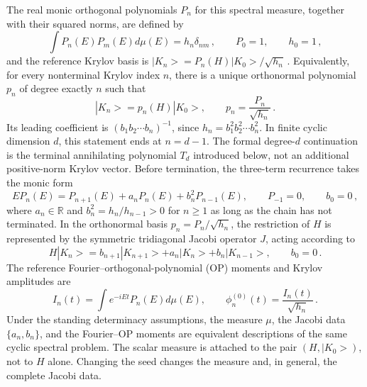 \documentclass[a4paper,11pt]{article}
\def\ket#1{|#1>}%
\def\dd{d}%
\def\ii{i}%
\def\ee{e}%
\def\Jac{J}%
\theoremstyle{definition}
\theoremstyle{remark}
\newcommand{\ket}[1]{|#1\rangle}
\newcommand{\dd}{\mathrm d}
\newcommand{\ii}{\mathrm i}
\newcommand{\ee}{\mathrm e}
\newcommand{\RR}{\mathbb R}
\newcommand{\Jac}{\mathsf J}
\begin{document}
The real monic orthogonal polynomials $P_n$ for this spectral measure, together with their squared norms, are defined by
\begin{equation}
   \int P_n(E)P_m(E)\dd\mu(E)=h_n\delta_{nm}\,,
   \qquad
   P_0=1,\qquad h_0=1\,,
   \label{eq:base-orthogonality}
\end{equation}
and the reference Krylov basis is
$
   \ket{K_n}=P_n(H)\ket{K_0}/\sqrt{h_n}\,.
$
Equivalently, for every nonterminal Krylov index $n$, there is a unique orthonormal polynomial $p_n$ of degree exactly $n$ such that
\begin{equation}
   \ket{K_n}=p_n(H)\ket{K_0},
   \qquad
   p_n=\frac{P_n}{\sqrt{h_n}}\,.
   \label{eq:orthonormal-polynomial-representative-main}
\end{equation}
Its leading coefficient is $(b_1b_2\cdots b_n)^{-1}$, since
$h_n=b_1^2b_2^2\cdots b_n^2$. In finite cyclic dimension $d$, this statement ends at $n=d-1$. The formal degree-$d$ continuation is the terminal annihilating polynomial $T_d$ introduced below, not an additional positive-norm Krylov vector. Before termination, the three-term recurrence takes the monic form~\cite{Chihara1978}
\begin{equation}
   E P_n(E)=P_{n+1}(E)+a_nP_n(E)+b_n^2P_{n-1}(E),
   \qquad
   P_{-1}=0,\qquad b_0=0\,,
   \label{eq:base-recurrence}
\end{equation}
where $a_n\in\RR$ and $b_n^2=h_n/h_{n-1}>0$ for $n\ge1$ as long as the chain has not terminated. In the orthonormal basis $p_n=P_n/\sqrt{h_n}$, the restriction of $H$ is represented by the symmetric tridiagonal Jacobi operator $\Jac$, acting according to
\begin{equation}
   H\ket{K_n}
   =
   b_{n+1}\ket{K_{n+1}}
   +a_n\ket{K_n}
   +b_n\ket{K_{n-1}},
   \qquad b_0=0\,.
   \label{eq:jacobi-action}
\end{equation}
The reference Fourier--orthogonal-polynomial (OP) moments and Krylov amplitudes are
\begin{equation}
   I_n(t)=\int \ee^{-\ii Et}P_n(E)\dd\mu(E),
   \qquad
   \phi_n^{(0)}(t)=\frac{I_n(t)}{\sqrt{h_n}}\,.
   \label{eq:base-moments}
\end{equation}
Under the standing determinacy assumptions, the measure $\mu$, the Jacobi data $\{a_n,b_n\}$, and the Fourier--OP moments are equivalent descriptions of the same cyclic spectral problem. The scalar measure is attached to the pair $(H,\ket{K_0})$, not to $H$ alone. Changing the seed changes the measure and, in general, the complete Jacobi data.
\end{document}
